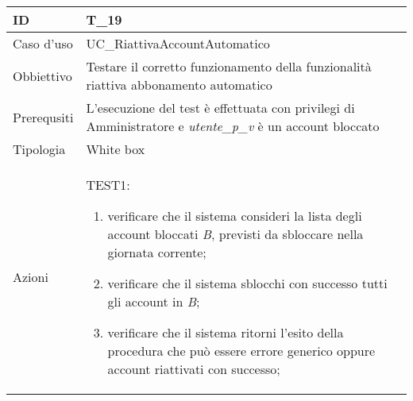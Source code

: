 \begin{table}[hb]
    \centering
    \begin{tabular}{ |p{2cm}|p{10cm}|  }
        \hline
        ID          & T\_19                                                                                                       \\\hline
        Caso d'uso  & UC\_RiattivaAccountAutomatico                                                                               \\\hline
        Obbiettivo  & Testare il corretto funzionamento della funzionalità riattiva abbonamento automatico                        \\\hline
        Prerequsiti & L'esecuzione del test è effettuata con privilegi di Amministratore e \emph{utente\_p\_v} è un account bloccato \\\hline
        Tipologia   & White box                                                                                                   \\\hline
        Azioni      &
        TEST1:
        \begin{enumerate}[nosep, topsep=0pt]
            \item verificare che il sistema consideri la lista degli account bloccati \emph{B}, previsti da sbloccare nella giornata corrente;
            \item verificare che il sistema sblocchi con successo tutti gli account in \emph{B};
            \item verificare che il sistema ritorni l'esito della procedura che può essere errore generico oppure account riattivati con successo;
        \end{enumerate}
        \\\hline
    \end{tabular}
\end{table}

